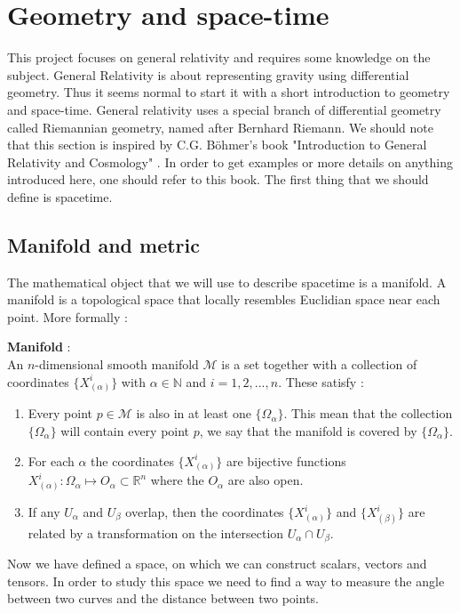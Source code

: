 \documentclass[a4paper,12pt]{article}
\theoremstyle{definition}
\begin{document}
\section{Geometry and space-time}
This project focuses on general relativity and requires some knowledge on the subject.
General Relativity is about representing gravity using differential geometry.
Thus it seems normal to start it with a short introduction to geometry and space-time.
General relativity uses a special branch of differential geometry called Riemannian geometry, named after Bernhard Riemann.
We should note that this section is inspired by C.G. B\"ohmer's book "Introduction to General Relativity and Cosmology" \cite{BoehmerBook}.
In order to get examples or more details on anything introduced here, one should refer to this book.
The first thing that we should define is spacetime.
\subsection{Manifold and metric}
The mathematical object that we will use to describe spacetime is a manifold.
A manifold is a topological space that locally resembles Euclidian space near each point.
More formally :
\begin{definition}
	\textbf{Manifold} :\\
	An $n$-dimensional smooth manifold $\mathcal{M}$ is a set together with a collection of coordinates $\{ X^i_{(\alpha)}\}$
	with $\alpha \in \mathbb{N}$ and $i=1,2,...,n$. These satisfy :
	\begin{enumerate}
		\item Every point $p\in\mathcal{M}$ is also in at least one $\{\Omega_\alpha\}$.
		This mean that the collection $\{\Omega_\alpha\}$ will contain every point $p$,
		we say that the manifold is covered by $\{\Omega_\alpha\}$.
		\item For each $\alpha$ the coordinates $\{ X^i_{(\alpha)}\}$ are bijective functions $X^i_{(\alpha)}:\Omega_\alpha \mapsto O_\alpha \subset \mathbb{R}^n$
		where the $O_\alpha$ are also open.
		\item If any $U_\alpha$ and $U_\beta$ overlap, then the coordinates $\{ X^i_{(\alpha)}\}$ and $\{ X^i_{(\beta)}\}$
		are related by a  transformation on the intersection $U_\alpha \cap U_\beta$.
	\end{enumerate}
\end{definition}
Now we have defined a space, on which we can construct scalars, vectors and tensors.
In order to study this space we need to find a way to measure the angle between two curves and the distance between two points.
\end{document}
